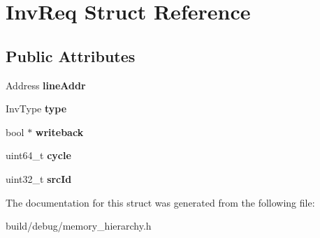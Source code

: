\hypertarget{structInvReq}{\section{Inv\-Req Struct Reference}
\label{structInvReq}
}
\subsection*{Public Attributes}
\begin{DoxyCompactItemize}
\item 
\hypertarget{structInvReq_a9f16132ca5dca960af111cbd1ced6502}{Address {\bfseries line\-Addr}}\label{structInvReq_a9f16132ca5dca960af111cbd1ced6502}

\item 
\hypertarget{structInvReq_aeec3fc9e09f02a2d7a1d9de9175e896d}{Inv\-Type {\bfseries type}}\label{structInvReq_aeec3fc9e09f02a2d7a1d9de9175e896d}

\item 
\hypertarget{structInvReq_ac586c94776e3de7639cb1fe228dbb012}{bool $\ast$ {\bfseries writeback}}\label{structInvReq_ac586c94776e3de7639cb1fe228dbb012}

\item 
\hypertarget{structInvReq_a1dcac7e748b9f5ba7c170445af35785b}{uint64\-\_\-t {\bfseries cycle}}\label{structInvReq_a1dcac7e748b9f5ba7c170445af35785b}

\item 
\hypertarget{structInvReq_a6dc852c7c27e072be4916c5c88f3e190}{uint32\-\_\-t {\bfseries src\-Id}}\label{structInvReq_a6dc852c7c27e072be4916c5c88f3e190}

\end{DoxyCompactItemize}


The documentation for this struct was generated from the following file\-:\begin{DoxyCompactItemize}
\item 
build/debug/memory\-\_\-hierarchy.\-h\end{DoxyCompactItemize}
